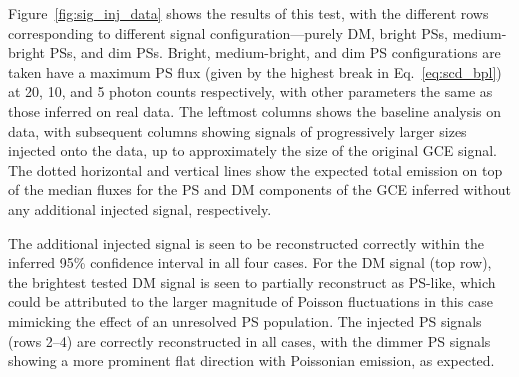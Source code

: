 \documentclass[prd,aps,10pt,nofootinbib,twocolumn,superscriptaddress,preprintnumbers,balancelastpage,longbibliography]{revtex4-1}
\begin{document}
Figure~\ref{fig:sig_inj_data} shows the results of this test, with the different rows corresponding to different signal configuration---purely DM, bright PSs, medium-bright PSs, and dim PSs. Bright, medium-bright, and dim PS configurations are taken have a maximum PS flux (given by the highest break in Eq.~\eqref{eq:scd_bpl}) at 20, 10, and 5 photon counts respectively, with other parameters the same as those inferred on real \Fermi data. The leftmost columns shows the baseline analysis on \Fermi data, with subsequent columns showing signals of progressively larger sizes injected onto the data, up to approximately the size of the original GCE signal. The dotted horizontal and vertical lines show the expected total emission on top of the median fluxes for the PS and DM components of the GCE inferred without any additional injected signal, respectively. 

The additional injected signal is seen to be reconstructed correctly within the inferred 95\% confidence interval in all four cases. For the DM signal (top row), the brightest tested DM signal is seen to partially reconstruct as PS-like, which could be attributed to the larger magnitude of Poisson fluctuations in this case mimicking the effect of an unresolved PS population. The injected PS signals (rows 2--4) are correctly reconstructed in all cases, with the dimmer PS signals showing a more prominent flat direction with Poissonian emission, as expected.
\end{document}
